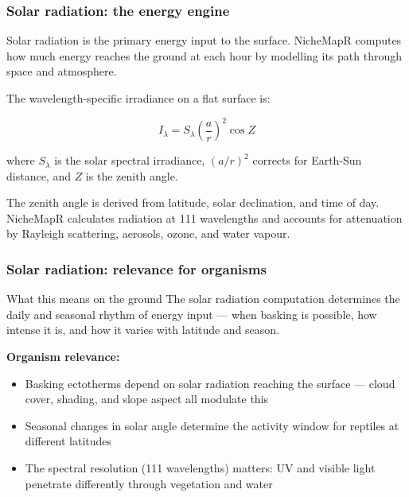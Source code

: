 \documentclass{beamer}
\begin{document}
\begin{frame}
  \frametitle{Solar radiation: the energy engine}

  Solar radiation is the primary energy input to the surface. NicheMapR computes how much energy reaches the ground at each hour by modelling its path through space and atmosphere.

  \vspace{0.2cm}

  The wavelength-specific irradiance on a flat surface is:

  \[I_\lambda = S_\lambda \left( \frac{a}{r} \right)^2 \cos Z\]

  where $S_\lambda$ is the solar spectral irradiance, $(a/r)^2$ corrects for Earth-Sun distance, and $Z$ is the zenith angle.

  \vspace{0.2cm}

  The zenith angle is derived from latitude, solar declination, and time of day. NicheMapR calculates radiation at 111 wavelengths and accounts for attenuation by Rayleigh scattering, aerosols, ozone, and water vapour.

\end{frame}

\begin{frame}
  \frametitle{Solar radiation: relevance for organisms}

  \begin{block}{What this means on the ground}
    The solar radiation computation determines the daily and seasonal rhythm of energy input --- when basking is possible, how intense it is, and how it varies with latitude and season.
  \end{block}

  \vspace{0.2cm}

  \textbf{Organism relevance:}
  \begin{itemize}
    \item Basking ectotherms depend on solar radiation reaching the surface --- cloud cover, shading, and slope aspect all modulate this
    \item Seasonal changes in solar angle determine the activity window for reptiles at different latitudes
    \item The spectral resolution (111 wavelengths) matters: UV and visible light penetrate differently through vegetation and water
  \end{itemize}
\end{frame}
\end{document}
